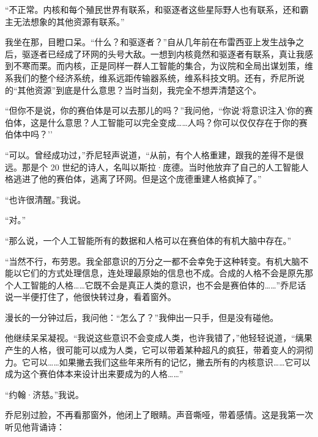 \documentclass[AutoFakeBold=true]{book}
\begin{document}
``不正常。内核和每个殖民世界有联系，和驱逐者这些星际野人也有联系，还和霸主无法想象的其他资源有联系。''

我坐在那，目瞪口呆。``什么？和驱逐者？''自从几年前在布雷西亚上发生战争之后，驱逐者已经成了环网的头号大敌。一想到内核竟然和驱逐者有联系，真让我感到不寒而栗。而内核，正是同样一群人工智能的集合，为议院和全局出谋划策，维系我们的整个经济系统，维系远距传输器系统，维系科技文明。还有，乔尼所说的``其他资源''到底是什么意思？当时当刻，我完全不想弄清楚这个。

``但你不是说，你的赛伯体是可以去那儿的吗？''我问他，``你说`将意识注入'你的赛伯体，这是什么意思？人工智能可以完全变成……人吗？你可以仅仅存在于你的赛伯体中吗？''

``可以。曾经成功过，''乔尼轻声说道，``从前，有个人格重建，跟我的差得不是很远。那是个 20 世纪的诗人，名叫以斯拉·庞德。当时他放弃了自己的人工智能人格逃进了他的赛伯体，逃离了环网。但是这个庞德重建人格疯掉了。''

``也许很清醒。''我说。

``对。''

``那么说，一个人工智能所有的数据和人格可以在赛伯体的有机大脑中存在。''

``当然不行，布劳恩。我全部意识的万分之一都不会幸免于这种转变。有机大脑不能以它们的方式处理信息，连处理最原始的信息也不成。合成的人格不会是原先那个人工智能的人格……它既不会是真正人类的意识，也不会是赛伯体的……''乔尼话说一半便打住了，他很快转过身，看着窗外。

漫长的一分钟过后，我问他：``怎么了？''我伸出一只手，但是没有碰他。

他继续呆呆凝视。``我说这些意识不会变成人类，也许我错了，''他轻轻说道，``缡果产生的人格，很可能可以成为人类，它可以带着某种超凡的疯狂，带着变人的洞彻力。它可以……如果撇去我们这些年来所有的记忆，撇去所有的内核意识……它可以成为这个赛伯体本来设计出来要成为的人格……''

``约翰·济慈。''我说。

乔尼别过脸，不再看那窗外，他闭上了眼睛。声音嘶哑，带着感情。这是我第一次听见他背诵诗：
\end{document}
